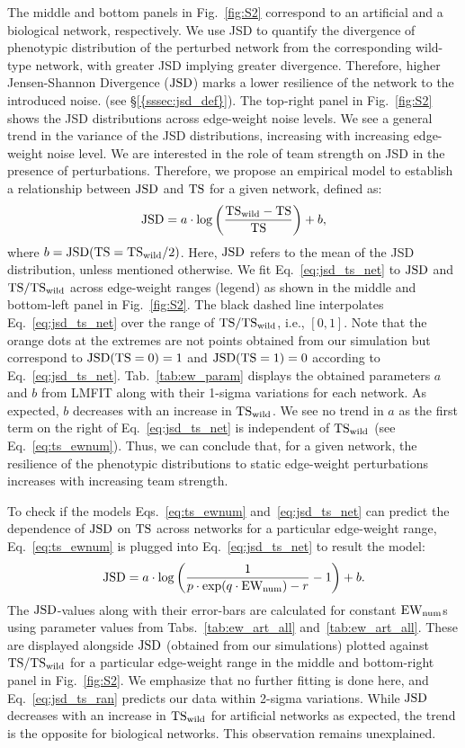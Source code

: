 The middle and bottom panels in Fig.~\ref{fig:S2} correspond to an artificial and a biological network, respectively. We use JSD to quantify the divergence of phenotypic distribution of the perturbed network from the corresponding wild-type network, with greater JSD implying greater divergence. Therefore, higher Jensen-Shannon Divergence ($\mathrm{JSD}$) marks a lower resilience of the network to the introduced noise.  (see \S\ref{{sssec:jsd_def}}). The top-right panel in Fig.~\ref{fig:S2} shows the JSD distributions across edge-weight noise levels. We see a general trend in the variance of the JSD distributions, increasing with increasing edge-weight noise level. We are interested in the role of team strength on JSD in the presence of perturbations. Therefore, we propose an empirical model to establish a relationship between $\mathrm{JSD}$ and $\mathrm{TS}$ for a given network, defined as:
\begin{equation} \label{eq:jsd_ts_net}
    \mathrm{JSD} = a\cdot\log\left(\frac{\mathrm{TS_{wild}}-\mathrm{TS}}{\mathrm{TS}}\right)+b,
\end{equation}
where $b=\mathrm{JSD}(\mathrm{TS}=\mathrm{TS_{wild}}/2)$. Here, $\mathrm{JSD}$ refers to the mean of the JSD distribution, unless mentioned otherwise. We fit Eq.~\ref{eq:jsd_ts_net} to $\mathrm{JSD}$ and $\mathrm{TS}/\mathrm{TS_{wild}}$ across edge-weight ranges (legend) as shown in the middle and bottom-left panel in Fig.~\ref{fig:S2}. The black dashed line interpolates Eq.~\ref{eq:jsd_ts_net} over the range of $\mathrm{TS}/\mathrm{TS_{wild}}$, i.e., $[0,1]$. Note that the orange dots at the extremes are not points obtained from our simulation but correspond to $\mathrm{JSD}(\mathrm{TS} = 0) = 1$ and $\mathrm{JSD}(\mathrm{TS} = 1) = 0$ according to Eq.~\ref{eq:jsd_ts_net}. Tab.~\ref{tab:ew_param} displays the obtained parameters $a$ and $b$ from LMFIT along with their 1-sigma variations for each network. As expected, $b$ decreases with an increase in $\mathrm{TS_{wild}}$. We see no trend in $a$ as the first term on the right of Eq.~\ref{eq:jsd_ts_net} is independent of $\mathrm{TS_{wild}}$ (see Eq.~\ref{eq:ts_ewnum}). Thus, we can conclude that, for a given network, the resilience of the phenotypic distributions to static edge-weight perturbations increases with increasing team strength.

To check if the models Eqs.~\ref{eq:ts_ewnum} and~\ref{eq:jsd_ts_net} can predict the dependence of $\mathrm{JSD}$ on $\mathrm{TS}$ across networks for a particular edge-weight range, Eq.~\ref{eq:ts_ewnum} is plugged into Eq.~\ref{eq:jsd_ts_net} to result the model:
\begin{equation} \label{eq:jsd_ts_ran}
    \mathrm{JSD} = a\cdot\log\left(\frac{1}{p\cdot\exp(q\cdot\mathrm{EW_{num}}) - r}-1\right)+b.
\end{equation}
The $\mathrm{JSD}$-values along with their error-bars are calculated for constant $\mathrm{EW_{num}}$s using parameter values from Tabs.~\ref{tab:ew_art_all} and~\ref{tab:ew_art_all}. These are displayed alongside $\mathrm{JSD}$ (obtained from our simulations) plotted against $\mathrm{TS}/\mathrm{TS_{wild}}$ for a particular edge-weight range in the middle and bottom-right panel in Fig.~\ref{fig:S2}. We emphasize that no further fitting is done here, and Eq.~\ref{eq:jsd_ts_ran} predicts our data within 2-sigma variations. While $\mathrm{JSD}$ decreases with an increase in $\mathrm{TS_{wild}}$ for artificial networks as expected, the trend is the opposite for biological networks. This observation remains unexplained.

